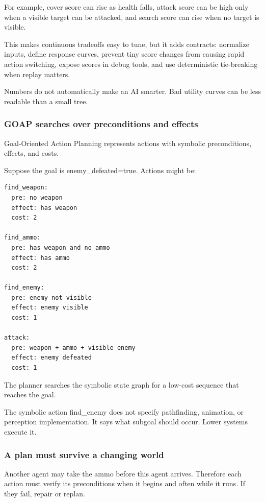 For example, cover score can rise as health falls, attack score can be high only when a visible target can be attacked, and search score can rise when no target is visible.

This makes continuous tradeoffs easy to tune, but it adds contracts: normalize inputs, define response curves, prevent tiny score changes from causing rapid action switching, expose scores in debug tools, and use deterministic tie-breaking when replay matters.

Numbers do not automatically make an AI smarter. Bad utility curves can be less readable than a small tree.

\subsubsection{GOAP searches over preconditions and effects}\label{goap-searches-over-preconditions-and-effects}

Goal-Oriented Action Planning represents actions with symbolic preconditions, effects, and costs.

Suppose the goal is enemy\_defeated=true. Actions might be:

\begin{verbatim}
find_weapon:
  pre: no weapon
  effect: has weapon
  cost: 2

find_ammo:
  pre: has weapon and no ammo
  effect: has ammo
  cost: 2

find_enemy:
  pre: enemy not visible
  effect: enemy visible
  cost: 1

attack:
  pre: weapon + ammo + visible enemy
  effect: enemy defeated
  cost: 1
\end{verbatim}

The planner searches the symbolic state graph for a low-cost sequence that reaches the goal.

The symbolic action find\_enemy does not specify pathfinding, animation, or perception implementation. It says what subgoal should occur. Lower systems execute it.

\subsubsection{A plan must survive a changing world}\label{a-plan-must-survive-a-changing-world}

Another agent may take the ammo before this agent arrives. Therefore each action must verify its preconditions when it begins and often while it runs. If they fail, repair or replan.

